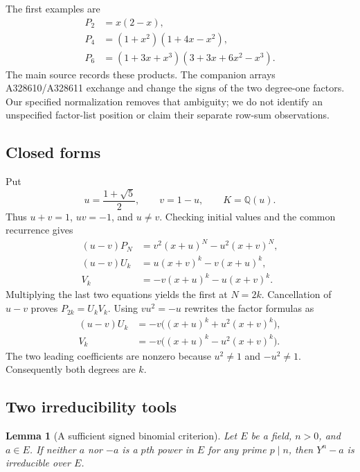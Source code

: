 \documentclass[11pt]{article}
\newtheorem{lemma}[theorem]{Lemma}
\newcommand{\Q}{\mathbb Q}
\begin{document}
The first examples are
\[
\begin{aligned}
 P_2&=x(2-x),\\
 P_4&=(1+x^2)(1+4x-x^2),\\
 P_6&=(1+3x+x^3)(3+3x+6x^2-x^3).
\end{aligned}
\]
The main source records these products. The companion arrays
A328610/A328611 exchange and change the signs of the two degree-one
factors. Our specified normalization removes that ambiguity; we do not
identify an unspecified factor-list position or claim their separate
row-sum observations.

\subsection{Closed forms}

Put
\[
 u=\frac{1+\sqrt5}{2},\qquad v=1-u,\qquad K=\Q(u).
\]
Thus $u+v=1$, $uv=-1$, and $u\ne v$. Checking initial values and the
common recurrence gives
\begin{align}
 (u-v)P_N&=v^2(x+u)^N-u^2(x+v)^N,\label{eq:p-closed9}\\
 (u-v)U_k&=u(x+v)^k-v(x+u)^k,\label{eq:u-closed9}\\
 V_k&=-v(x+u)^k-u(x+v)^k.\label{eq:v-closed9}
\end{align}
Multiplying the last two equations yields the first at $N=2k$.
Cancellation of $u-v$ proves $P_{2k}=U_kV_k$. Using $vu^2=-u$ rewrites
the factor formulas as
\begin{align}
 (u-v)U_k&=-v\big((x+u)^k+u^2(x+v)^k\big),\label{eq:u-transform9}\\
 V_k&=-v\big((x+u)^k-u^2(x+v)^k\big).\label{eq:v-transform9}
\end{align}
The two leading coefficients are nonzero because $u^2\ne1$ and
$-u^2\ne1$. Consequently both degrees are $k$.

\subsection{Two irreducibility tools}

\begin{lemma}[A sufficient signed binomial criterion]\label{lem:signed9}
Let $E$ be a field, $n>0$, and $a\in E$. If neither $a$ nor $-a$ is a
$p$th power in $E$ for any prime $p\mid n$, then $Y^n-a$ is irreducible
over $E$.
\end{lemma}
\end{document}
